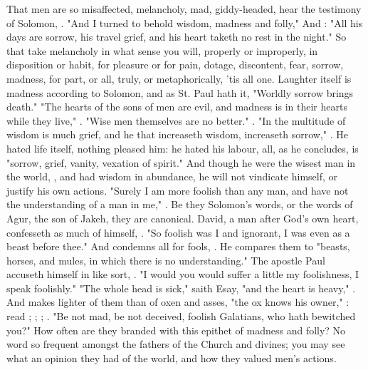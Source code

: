That men are so misaffected, melancholy, mad, giddy-headed, hear the testimony
of Solomon, . "And I turned to behold wisdom,
madness and folly," \etc{} And : "All his days are sorrow, his
travel grief, and his heart taketh no rest in the night." So that take
melancholy in what sense you will, properly or improperly, in disposition or
habit, for pleasure or for pain, dotage, discontent, fear, sorrow, madness, for
part, or all, truly, or metaphorically, 'tis all one. Laughter itself is
madness according to Solomon, and as St. Paul hath it, "Worldly sorrow brings
death." "The hearts of the sons of men are evil, and madness is in their hearts
while they live," . "Wise men themselves are no
better." . "In the multitude of wisdom is much grief,
and he that increaseth wisdom, increaseth sorrow," .
He hated life itself, nothing pleased him: he hated his labour, all, as
he concludes, is "sorrow, grief, vanity, vexation of
spirit." And though he were the wisest man in the world, , and had wisdom in abundance, he will not vindicate himself, or
justify his own actions. "Surely I am more foolish than any man, and have not
the understanding of a man in me," . Be they
Solomon's words, or the words of Agur, the son of Jakeh, they are canonical.
David, a man after God's own heart, confesseth as much of himself,
. "So foolish was I and ignorant, I was even
as a beast before thee." And condemns all for fools, . He compares them to "beasts,
horses, and mules, in which there is no understanding." The apostle Paul
accuseth himself in like sort, . "I would you would
suffer a little my foolishness, I speak foolishly." "The whole head is sick,"
saith Esay, "and the heart is heavy," . And makes
lighter of them than of oxen and asses, "the ox knows his owner," \etc{}: read
; ; ; . "Be not mad, be not deceived, foolish
Galatians, who hath bewitched you?" How often are they branded with this
epithet of madness and folly? No word so frequent amongst the fathers of the
Church and divines; you may see what an opinion they had of the world, and how
they valued men's actions.

